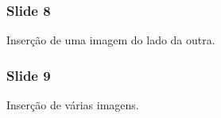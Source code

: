 \documentclass{beamer}
\begin{document}
\begin{frame}
\frametitle{Slide 8}

Inserção de uma imagem do lado da outra.
\begin{figure}[!h]
    \centering
    \begin{minipage}{0.5\textwidth}
        \centering
    \end{minipage}\hfill
    \begin{minipage}{0.5\textwidth}
        \centering
    \end{minipage}
\end{figure}

\end{frame}

\begin{frame}
\frametitle{Slide 9}

Inserção de várias imagens.
\begin{figure}[!h]
    \centering
\end{figure}

\end{frame}
\end{document}
